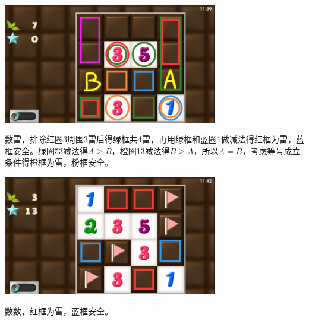 \subsection{} %
\begin{center}
    \includegraphics[width=0.7\textwidth]{puzzle/130-1.png}
\end{center}
数雷，排除红圈3周围3雷后得绿框共4雷，再用绿框和蓝圈1做减法得红框为雷，蓝框安全。绿圈53减法得$A\ge B$，橙圈13减法得$B\ge A$，所以$A=B$，考虑等号成立条件得橙框为雷，粉框安全。
\begin{center}
    \includegraphics[width=0.7\textwidth]{puzzle/130-2.png}
\end{center}
数数，红框为雷，蓝框安全。

